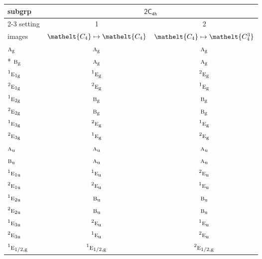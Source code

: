 \documentclass[10pt,a4paper]{article}
\numberwithin{equation}{section}
\newcommand{\eltfont}[1]{{\let\sigma\eltsigma\mathelt{#1}}}
\newcommand{\grp}[1]{\mathsf{#1}}
\newcommand{\irr}[1]{\text{\normalfont\scshape #1}}
\newcommand{\conjpair}[1]{{}^{#1}}
\newcommand{\cls}[1]{\eltfont{#1}}
\newcommand{\ptag}[1]{\mathrm{#1}}
\begin{document}
{\small\begin{longtable}{@{}lcc@{}}\toprule
subgrp & \multicolumn{2}{c}{\href{2C4h.pdf}{$\grp{2C_{4h}}$}}\\\cmidrule(lr){2-3}
setting & 1 & 2\\
images & {\scriptsize $\cls{C_{4}} \mapsto \cls{C_{4}}$} & {\scriptsize $\cls{C_{4}} \mapsto \cls{C_{4}^{3}}$}\\\midrule\endhead
\bottomrule\endfoot\endlastfoot
$\irr{a}_{\ptag{g}}$ & $\irr{a}_{\ptag{g}}$ & $\irr{a}_{\ptag{g}}$\\*
$\irr{b}_{\ptag{g}}$ & $\irr{a}_{\ptag{g}}$ & $\irr{a}_{\ptag{g}}$\\
$\conjpair{1}\irr{e}_{1\ptag{g}}$ & $\conjpair{1}\irr{e}_{\ptag{g}}$ & $\conjpair{2}\irr{e}_{\ptag{g}}$\\
$\conjpair{2}\irr{e}_{1\ptag{g}}$ & $\conjpair{2}\irr{e}_{\ptag{g}}$ & $\conjpair{1}\irr{e}_{\ptag{g}}$\\
$\conjpair{1}\irr{e}_{2\ptag{g}}$ & $\irr{b}_{\ptag{g}}$ & $\irr{b}_{\ptag{g}}$\\
$\conjpair{2}\irr{e}_{2\ptag{g}}$ & $\irr{b}_{\ptag{g}}$ & $\irr{b}_{\ptag{g}}$\\
$\conjpair{1}\irr{e}_{3\ptag{g}}$ & $\conjpair{2}\irr{e}_{\ptag{g}}$ & $\conjpair{1}\irr{e}_{\ptag{g}}$\\
$\conjpair{2}\irr{e}_{3\ptag{g}}$ & $\conjpair{1}\irr{e}_{\ptag{g}}$ & $\conjpair{2}\irr{e}_{\ptag{g}}$\\
$\irr{a}_{\ptag{u}}$ & $\irr{a}_{\ptag{u}}$ & $\irr{a}_{\ptag{u}}$\\
$\irr{b}_{\ptag{u}}$ & $\irr{a}_{\ptag{u}}$ & $\irr{a}_{\ptag{u}}$\\
$\conjpair{1}\irr{e}_{1\ptag{u}}$ & $\conjpair{1}\irr{e}_{\ptag{u}}$ & $\conjpair{2}\irr{e}_{\ptag{u}}$\\
$\conjpair{2}\irr{e}_{1\ptag{u}}$ & $\conjpair{2}\irr{e}_{\ptag{u}}$ & $\conjpair{1}\irr{e}_{\ptag{u}}$\\
$\conjpair{1}\irr{e}_{2\ptag{u}}$ & $\irr{b}_{\ptag{u}}$ & $\irr{b}_{\ptag{u}}$\\
$\conjpair{2}\irr{e}_{2\ptag{u}}$ & $\irr{b}_{\ptag{u}}$ & $\irr{b}_{\ptag{u}}$\\
$\conjpair{1}\irr{e}_{3\ptag{u}}$ & $\conjpair{2}\irr{e}_{\ptag{u}}$ & $\conjpair{1}\irr{e}_{\ptag{u}}$\\
$\conjpair{2}\irr{e}_{3\ptag{u}}$ & $\conjpair{1}\irr{e}_{\ptag{u}}$ & $\conjpair{2}\irr{e}_{\ptag{u}}$\\
$\conjpair{1}\irr{e}_{1/2,\ptag{g}}$ & $\conjpair{1}\irr{e}_{1/2,\ptag{g}}$ & $\conjpair{2}\irr{e}_{1/2,\ptag{g}}$\\

\end{longtable}}
\end{document}
